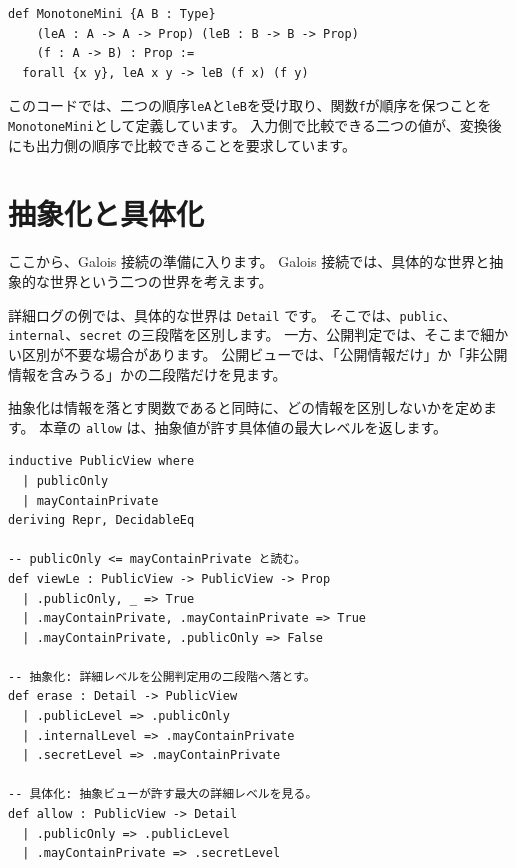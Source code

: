 \begin{listing}[htbp]
\begin{verbatim}
def MonotoneMini {A B : Type}
    (leA : A -> A -> Prop) (leB : B -> B -> Prop)
    (f : A -> B) : Prop :=
  forall {x y}, leA x y -> leB (f x) (f y)
\end{verbatim}
\caption{\texttt{MonotoneMini}}
\label{lst:ch22-monotone}
\end{listing}

このコードでは、二つの順序\texttt{leA}と\texttt{leB}を受け取り、関数\texttt{f}が順序を保つことを\texttt{MonotoneMini}として定義しています。
入力側で比較できる二つの値が、変換後にも出力側の順序で比較できることを要求しています。

\section{抽象化と具体化}

ここから、Galois 接続の準備に入ります。
Galois 接続では、具体的な世界と抽象的な世界という二つの世界を考えます。

詳細ログの例では、具体的な世界は \texttt{Detail} です。
そこでは、\texttt{public}、\texttt{internal}、\texttt{secret} の三段階を区別します。
一方、公開判定では、そこまで細かい区別が不要な場合があります。
公開ビューでは、「公開情報だけ」か「非公開情報を含みうる」かの二段階だけを見ます。

抽象化は情報を落とす関数であると同時に、どの情報を区別しないかを定めます。
本章の \texttt{allow} は、抽象値が許す具体値の最大レベルを返します。

\begin{listing}[htbp]
\begin{verbatim}
inductive PublicView where
  | publicOnly
  | mayContainPrivate
deriving Repr, DecidableEq

-- publicOnly <= mayContainPrivate と読む。
def viewLe : PublicView -> PublicView -> Prop
  | .publicOnly, _ => True
  | .mayContainPrivate, .mayContainPrivate => True
  | .mayContainPrivate, .publicOnly => False

-- 抽象化: 詳細レベルを公開判定用の二段階へ落とす。
def erase : Detail -> PublicView
  | .publicLevel => .publicOnly
  | .internalLevel => .mayContainPrivate
  | .secretLevel => .mayContainPrivate

-- 具体化: 抽象ビューが許す最大の詳細レベルを見る。
def allow : PublicView -> Detail
  | .publicOnly => .publicLevel
  | .mayContainPrivate => .secretLevel
\end{verbatim}
\caption{\texttt{erase} と \texttt{allow}}
\label{lst:ch22-view}
\end{listing}

